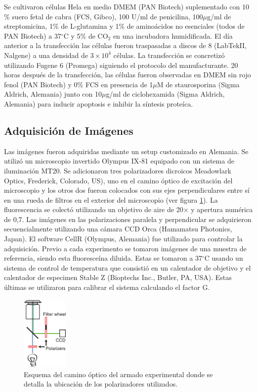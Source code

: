 Se cultivaron células Hela en medio DMEM (PAN Biotech) suplementado con 10$\%$ suero fetal de cabra (FCS, Gibco), 100 U/ml de penicilina, 100$\mu$g/ml de streptomicina, 1$\%$ de L-glutamina y 1$\%$ de aminoácidos no esenciales (todos de PAN Biotech) a 37$^{\circ}$C y 5$\%$ de CO$_2$ en una incubadora humidificada. El día anterior a la transfección las células fueron traspasadas a discos de 8  (LabTekII, Nalgene) a una densidad de $3\times10^4$ células. La transfección se concretizó utilizando Fugene 6 (Promega) siguiendo el protocolo del manufacturante. 20 horas después de la transfección, las células fueron observadas en DMEM sin rojo fenol (PAN Biotech) y 0$\%$ FCS en presencia de 1$\mu$M de staurosporina (Sigma Aldrich, Alemania) junto con 10$\mu$g/ml de ciclohexamida (Sigma Aldrich, Alemania) para inducir apoptosis e inhibir la síntesis proteíca.

\subsection{Adquisición de Imágenes}

Las imágenes fueron adquiridas mediante un setup customizado en Alemania. Se utilizó un microscopio invertido Olympus IX-81 equipado con un sistema de iluminación MT20. Se adicionaron tres polarizadores dicroicos Meadowlark Optics, Frederick, Colorado, US), uno en el camino óptico de excitación del microscopio y los otros dos fueron colocados con sus ejes perpendiculares entre sí en una rueda de filtros en el exterior del microscopio (ver figura \ref{fig:armadoExp}). La fluorescencia se colectó utilizando un objetivo de aire de 20$\times$ y apertura numérica de 0,7. Las imágenes en las polarizaciones paralela y perpendicular se adquirieron secuencialmente utilizando una cámara CCD Orca (Hamamatsu Photonics, Japan). El software CellR (Olympus, Alemania) fue utilizado para controlar la adquisición. Previo a cada experimento se tomaron imágenes de una muestra de referencia, siendo esta fluoresceína diluida. Estas se tomaron a 37$^{\circ}$C usando un sistema de control de temperatura que consistió en un calentador de objetivo y el calentador de especimen Stable Z (Bioptechs Inc., Butler, PA, USA). Estas últimas se utilizaron para calibrar el sistema calculando el factor G.

\begin{figure}
    \centering
    \includegraphics[width=0.2\textwidth]{./img/Cap4/ArmadoExp.png}
    \caption{Esquema del camino óptico del armado experimental donde se detalla la ubicación de los polarizadores utilizados.}
    \label{fig:armadoExp}
\end{figure}

